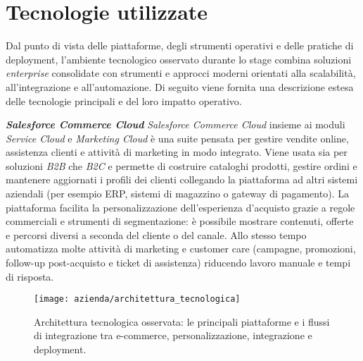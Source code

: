 \section{Tecnologie utilizzate}

Dal punto di vista delle piattaforme, degli strumenti operativi e delle pratiche di deployment, l’ambiente tecnologico osservato durante lo stage combina soluzioni \emph{enterprise} 
consolidate con strumenti e approcci moderni orientati alla scalabilità, all’integrazione e all’automazione. 
Di seguito viene fornita una descrizione estesa delle tecnologie principali e del loro impatto operativo.

\medskip
\noindent\textbf{\emph{Salesforce Commerce Cloud}}
\emph{Salesforce Commerce Cloud} insieme ai moduli \emph{Service Cloud} e \emph{Marketing Cloud} è una suite pensata per gestire vendite online, assistenza clienti e 
attività di marketing in modo integrato. Viene usata sia per soluzioni \emph{B2B} che \emph{B2C} e permette di costruire cataloghi prodotti, gestire ordini e mantenere 
aggiornati i profili dei clienti collegando la piattaforma ad altri sistemi aziendali (per esempio ERP, sistemi di magazzino o gateway di pagamento).
La piattaforma facilita la personalizzazione dell’esperienza d’acquisto grazie a regole commerciali e strumenti di segmentazione: è possibile mostrare contenuti, 
offerte e percorsi diversi a seconda del cliente o del canale. Allo stesso tempo automatizza molte attività di marketing e customer care (campagne, promozioni, 
follow-up post-acquisto e ticket di assistenza) riducendo lavoro manuale e tempi di risposta.

\begin{figure}[htbp]
    \centering
    \texttt{[image: azienda/architettura\_tecnologica]}
    \caption{Architettura tecnologica osservata: le principali piattaforme e i flussi di integrazione tra e-commerce, personalizzazione, integrazione e deployment.}
    \label{fig:architettura_tecnologica}
\end{figure}


